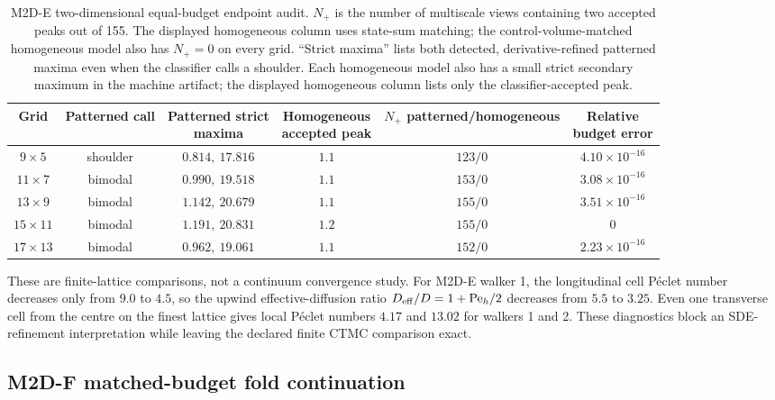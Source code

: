 \documentclass[aps,pre,reprint,amsmath,amssymb,longbibliography,floatfix]{revtex4-2}
\begin{document}
\begin{table}[!t]
\caption{\label{tab:matched}
M2D-E two-dimensional equal-budget endpoint audit. \(N_+\) is the number of
multiscale views containing two accepted peaks out of 155. The displayed
homogeneous column uses state-sum matching; the control-volume-matched
homogeneous model also has \(N_+=0\) on every grid. ``Strict maxima'' lists
both detected, derivative-refined patterned maxima even when the classifier
calls a shoulder. Each homogeneous model also has a small strict secondary
maximum in the machine artifact; the displayed homogeneous column lists only
the classifier-accepted peak.}
\begin{ruledtabular}
\begin{tabular}{cccccc}
Grid & Patterned call & \shortstack{Patterned strict\\maxima}
& \shortstack{Homogeneous\\accepted peak}
& \shortstack{\(N_+\)\\patterned/homogeneous}
& \shortstack{Relative\\budget error}\\
\hline
\(9\times5\)   & shoulder & \(0.814,\ 17.816\) & \(1.1\) & \(123/0\) & \(4.10\times10^{-16}\)\\
\(11\times7\)  & bimodal & \(0.990,\ 19.518\) & \(1.1\) & \(153/0\) & \(3.08\times10^{-16}\)\\
\(13\times9\)  & bimodal & \(1.142,\ 20.679\) & \(1.1\) & \(155/0\) & \(3.51\times10^{-16}\)\\
\(15\times11\) & bimodal & \(1.191,\ 20.831\) & \(1.2\) & \(155/0\) & \(0\)\\
\(17\times13\) & bimodal & \(0.962,\ 19.061\) & \(1.1\) & \(152/0\) & \(2.23\times10^{-16}\)
\end{tabular}
\end{ruledtabular}
\end{table}

These are finite-lattice comparisons, not a continuum convergence study. For
M2D-E walker 1, the longitudinal cell P\'eclet number decreases only from
\(9.0\) to \(4.5\), so the upwind effective-diffusion ratio
\(D_{\rm eff}/D=1+\mathrm{Pe}_h/2\) decreases from \(5.5\) to \(3.25\).
Even one transverse cell from the centre on the finest lattice gives local
P\'eclet numbers \(4.17\) and \(13.02\) for walkers 1 and 2. These diagnostics
block an SDE-refinement interpretation while leaving the declared finite CTMC
comparison exact.

\subsection{M2D-F matched-budget fold continuation}
\label{sec:2d-fold-continuation}
\end{document}
